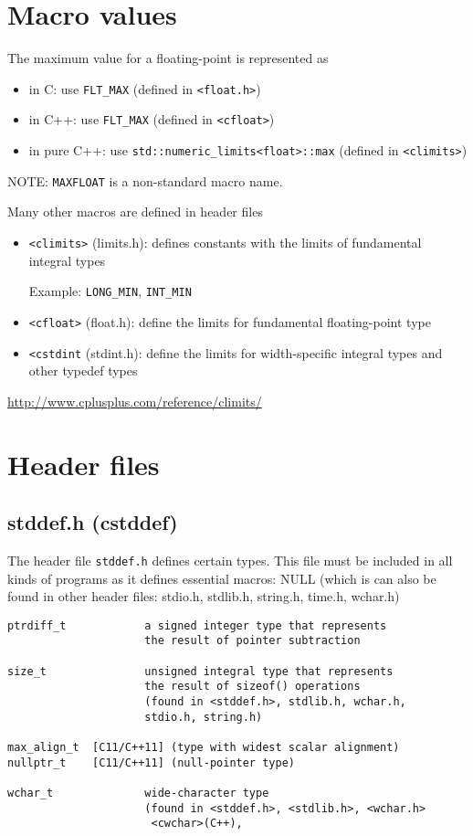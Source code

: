 \section{Macro values}


The maximum value for a floating-point is represented as
\begin{itemize}
  \item in C: use \verb!FLT_MAX! (defined in \verb!<float.h>!)
  \item in C++: use \verb!FLT_MAX! (defined in \verb!<cfloat>!)
  \item in pure C++: use \verb!std::numeric_limits<float>::max! (defined in
  \verb!<climits>!)
\end{itemize}
NOTE: \verb!MAXFLOAT! is a non-standard macro name.

Many other macros are defined in header files 
\begin{itemize}
  \item  \verb!<climits>! (limits.h):  defines constants with the limits of
  fundamental integral types
  
Example: \verb!LONG_MIN!, \verb!INT_MIN!  
  
  \item \verb!<cfloat>! (float.h): define the limits for fundamental
  floating-point type
  
  \item \verb!<cstdint! (stdint.h): define the  limits for width-specific
  integral types and other typedef types
\end{itemize}
\url{http://www.cplusplus.com/reference/climits/}


\section{Header files}

\subsection{stddef.h (cstddef)}
\label{sec:stddef.h}


The header file \verb!stddef.h! defines certain types.  This file must be
included in all kinds of programs as it defines essential macros: NULL (which
is can also be found in other header files: stdio.h, stdlib.h, string.h,
time.h, wchar.h)

\begin{verbatim}
ptrdiff_t            a signed integer type that represents 
                     the result of pointer subtraction
                      
size_t               unsigned integral type that represents
                     the result of sizeof() operations
                     (found in <stddef.h>, stdlib.h, wchar.h, 
                     stdio.h, string.h) 
                     
max_align_t  [C11/C++11] (type with widest scalar alignment)
nullptr_t    [C11/C++11] (null-pointer type)

wchar_t              wide-character type
                     (found in <stddef.h>, <stdlib.h>, <wchar.h>
                      <cwchar>(C++), 
\end{verbatim}

